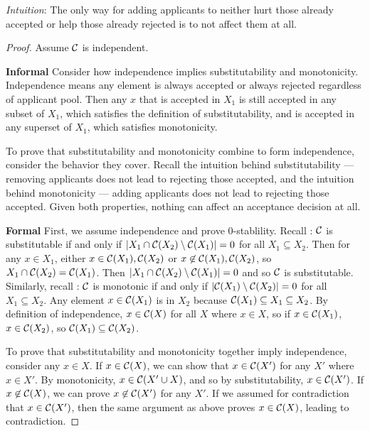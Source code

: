 \textit{Intuition}: The only way for adding applicants to neither hurt those already accepted or help those already rejected is to not affect them at all.
\begin{proof}
    Assume $\mathcal{C}$ is independent.

    \textbf{Informal}
    Consider how independence implies substitutability and monotonicity. Independence means any element is always accepted or always rejected regardless of applicant pool. Then any $x$ that is accepted in $X_1$ is still accepted in any subset of $X_1$, which satisfies the definition of substitutability, and is accepted in any superset of $X_1$, which satisfies monotonicity.

    To prove that substitutability and monotonicity combine to form independence, consider the behavior they cover. Recall the intuition behind substitutability --- removing applicants does not lead to rejecting those accepted, and the intuition behind monotonicity --- adding applicants does not lead to rejecting those accepted. Given both properties, nothing can affect an acceptance decision at all.

    \textbf{Formal}
    First, we assume independence and prove $0$-stablility.
    Recall : $\mathcal{C}$ is substitutable if and only if $|X_1 \cap \mathcal{C}(X_2) \setminus \mathcal{C}(X_1)| = 0$ for all $X_1 \subseteq X_2$. Then for any $x \in X_1$, either $x \in \mathcal{C}(X_1),\mathcal{C}(X_2)$ or $x \not\in \mathcal{C}(X_1),\mathcal{C}(X_2)$, so $X_1 \cap \mathcal{C}(X_2) = \mathcal{C}(X_1)$. Then $|X_1 \cap \mathcal{C}(X_2) \setminus \mathcal{C}(X_1)| = 0$ and so $\mathcal{C}$ is substitutable. Similarly, recall : $\mathcal{C}$ is monotonic if and only if $|\mathcal{C}(X_1) \setminus \mathcal{C}(X_2)| = 0$ for all $X_1 \subseteq X_2$. Any element $x \in \mathcal{C}(X_1)$ is in $X_2$ because $\mathcal{C}(X_1) \subseteq X_1 \subseteq X_2$. By definition of independence, $x \in \mathcal{C}(X)$ for all $X$ where $x \in X$, so if $x \in \mathcal{C}(X_1)$, $x \in \mathcal{C}(X_2)$, so $\mathcal{C}(X_1) \subseteq \mathcal{C}(X_2)$.

    To prove that substitutability and monotonicity together imply independence, consider any $x \in X$. If $x \in \mathcal{C}(X)$, we can show that $x \in \mathcal{C}(X')$ for any $X'$ where $x \in X'$. By monotonicity, $x \in \mathcal{C}(X' \cup X)$, and so by substitutability, $x \in \mathcal{C}(X')$. If $x \not\in \mathcal{C}(X)$, we can prove $x \not\in \mathcal{C}(X')$ for any $X'$. If we assumed for contradiction that $x \in \mathcal{C}(X')$, then the same argument as above proves $x \in \mathcal{C}(X)$, leading to contradiction.
\end{proof}

